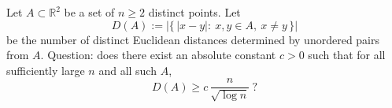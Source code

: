 Let $A\subset\mathbb{R}^2$ be a set of $n\ge 2$ distinct points. Let
\[
D(A):=\bigl|\{\,|x-y|:\ x,y\in A,\ x\ne y\,\}\bigr|
\]
be the number of distinct Euclidean distances determined by unordered pairs from $A$.
Question: does there exist an absolute constant $c>0$ such that for all sufficiently large $n$ and all such $A$,
\[
D(A)\ge c\,\frac{n}{\sqrt{\log n}}\ ?
\]
